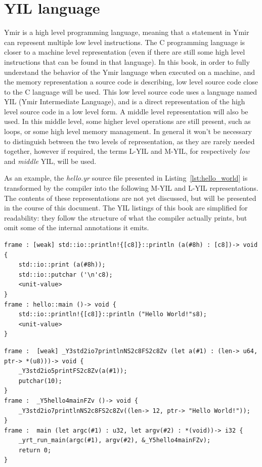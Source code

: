 \section{YIL language}
\label{sec:(chap1):yil_language}

Ymir is a high level programming language, meaning that a statement in Ymir can
represent multiple low level instructions. The C programming language is closer
to a machine level representation (even if there are still some high level
instructions that can be found in that language). In this book, in order to
fully understand the behavior of the Ymir language when executed on a machine,
and the memory representation a source code is describing, low level source code
close to the C language will be used. This low level source code uses a language
named YIL (Ymir Intermediate Language), and is a direct representation of the
high level source code in a low level form. A middle level representation will
also be used. In this middle level, some higher level operations are still
present, such as loops, or some high level memory management. In general it
won't be necessary to distinguish between the two levels of representation, as
they are rarely needed together, however if required, the terms L-YIL and
M-YIL, for respectively \textit{low} and \textit{middle} YIL, will be used.


As an example, the \textit{hello.yr} source file presented in
Listing~\ref{lst:hello_world} is transformed by the compiler into the following
M-YIL and L-YIL representations. The contents of these representations are not
yet discussed, but will be presented in the course of this document. The YIL
listings of this book are simplified for readability: they follow the structure
of what the compiler actually prints, but omit some of the internal annotations
it emits.

\begin{lstlisting}[style=myilVerb, caption=M-YIL representation of \textit{hello.yr}]
frame : [weak] std::io::println!{[c8]}::println (a(#8h) : [c8])-> void {
    std::io::print (a(#8h));
    std::io::putchar ('\n'c8);
    <unit-value>
}
frame : hello::main ()-> void {
    std::io::println!{[c8]}::println ("Hello World!"s8);
    <unit-value>
}
\end{lstlisting}

\begin{lstlisting}[style=lyilVerb, caption=L-YIL representation of \textit{hello.yr}]
frame :  [weak] _Y3std2io7printlnNS2c8FS2c8Zv (let a(#1) : (len-> u64, ptr-> *(u8)))-> void {
    _Y3std2io5printFS2c8Zv(a(#1));
    putchar(10);
}
frame :  _Y5hello4mainFZv ()-> void {
    _Y3std2io7printlnNS2c8FS2c8Zv((len-> 12, ptr-> "Hello World!"));
}
frame :  main (let argc(#1) : u32, let argv(#2) : *(void))-> i32 {
    _yrt_run_main(argc(#1), argv(#2), &_Y5hello4mainFZv);
    return 0;
}
\end{lstlisting}

